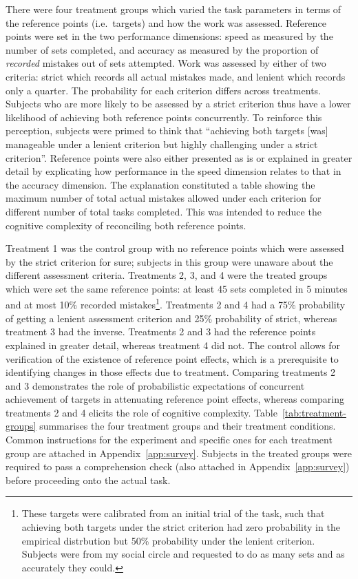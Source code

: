 \documentclass[12pt, letterpaper]{article}
\begin{document}
There were four treatment groups which varied the task parameters in terms of the reference points (i.e.~targets) and how the work was assessed. Reference points were set in the two performance dimensions: speed as measured by the number of sets completed, and accuracy as measured by the proportion of \emph{recorded} mistakes out of sets attempted. Work was assessed by either of two criteria: strict which records all actual mistakes made, and lenient which records only a quarter. The probability for each criterion differs across treatments. Subjects who are more likely to be assessed by a strict criterion thus have a lower likelihood of achieving both reference points concurrently. To reinforce this perception, subjects were primed to think that ``achieving both targets [was] manageable under a lenient criterion but highly challenging under a strict criterion''. Reference points were also either presented as is or explained in greater detail by explicating how performance in the speed dimension relates to that in the accuracy dimension. The explanation constituted a table showing the maximum number of total actual mistakes allowed under each criterion for different number of total tasks completed. This was intended to reduce the cognitive complexity of reconciling both reference points.

Treatment 1 was the control group with no reference points which were assessed by the strict criterion for sure; subjects in this group were unaware about the different assessment criteria. Treatments 2, 3, and 4 were the treated groups which were set the same reference points: at least 45 sets completed in 5 minutes and at most 10\% recorded mistakes\footnote{These targets were calibrated from an initial trial of the task, such that achieving both targets under the strict criterion had zero probability in the empirical distrbution but 50\% probability under the lenient criterion. Subjects were from my social circle and requested to do as many sets and as accurately they could.}. Treatments 2 and 4 had a 75\% probability of getting a lenient assessment criterion and 25\% probability of strict, whereas treatment 3 had the inverse. Treatments 2 and 3 had the reference points explained in greater detail, whereas treatment 4 did not. The control allows for verification of the existence of reference point effects, which is a prerequisite to identifying changes in those effects due to treatment. Comparing treatments 2 and 3 demonstrates the role of probabilistic expectations of concurrent achievement of targets in attenuating reference point effects, whereas comparing treatments 2 and 4 elicits the role of cognitive complexity. Table~\ref{tab:treatment-groups} summarises the four treatment groups and their treatment conditions. Common instructions for the experiment and specific ones for each treatment group are attached in Appendix~\ref{app:survey}. Subjects in the treated groups were required to pass a comprehension check (also attached in Appendix~\ref{app:survey}) before proceeding onto the actual task.
\end{document}
